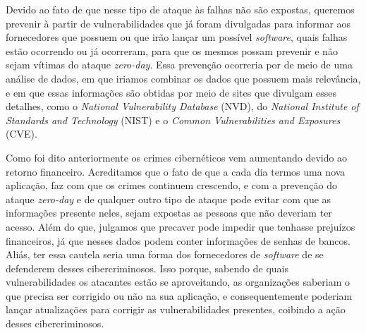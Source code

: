 Devido ao fato de que nesse tipo de ataque às falhas não são expostas, queremos prevenir à partir de vulnerabilidades que já foram 
divulgadas para informar aos fornecedores que possuem ou que irão lançar um possível \textit{software}, quais falhas estão ocorrendo ou 
já ocorreram, para que os mesmos possam prevenir e não sejam vítimas do ataque \textit{zero-day}. Essa prevenção ocorreria por de meio de 
uma análise de dados, em que iriamos combinar os dados que possuem mais relevância, e em que essas informações são obtidas por meio de 
sites que divulgam esses detalhes, como o \textit{National Vulnerability Database} (NVD), do \textit{National Institute of Standards and 
Technology} (NIST) e o \textit{Common Vulnerabilities and Exposures} (CVE).

Como foi dito anteriormente os crimes cibernéticos vem aumentando devido ao retorno financeiro. Acreditamos que o fato de que a cada dia 
termos uma nova aplicação, faz com que os crimes continuem crescendo, e com a prevenção do ataque \textit{zero-day} e de qualquer outro 
tipo de ataque pode evitar com que as informações presente neles, sejam expostas as pessoas que não deveriam ter acesso. Além do que, 
julgamos que precaver pode impedir que tenhasse prejuízos financeiros, já que nesses dados podem conter informações de senhas de bancos. 
Aliás, ter essa cautela seria uma forma dos fornecedores de \textit{software} de se defenderem desses cibercriminosos. Isso porque, 
sabendo de quais vulnerabilidades os atacantes estão se aproveitando, as organizações saberiam o que precisa ser corrigido ou não na sua 
aplicação, e consequentemente poderiam lançar atualizações para corrigir as vulnerabilidades presentes, coibindo a ação desses 
cibercriminosos.
